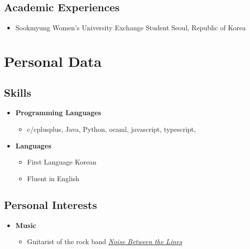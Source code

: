 \documentclass[11pt,a4paper,sans]{moderncv}
\newcommand{\seoul}{Seoul, Republic of Korea}
\begin{document}
\subsection{Academic Experiences}
\vspace{5pt}
\begin{itemize}
    \item{
                  {Sookmyung Women's University}
                  {Exchange Student}
                  {\seoul}
                  {}
                  {}
    }
\vspace{4mm}
\end{itemize}

\section{Personal Data}

\vspace{6pt}

\subsection{Skills}
\vspace{5pt}

\begin{itemize}



\item \textbf{Programming Languages}  
\vspace{-2mm}
\begin{itemize}
    \item c/cplusplus, Java, Python, ocaml, javascript, typescript, 
\end{itemize}


\item \textbf{Languages}
\vspace{-2mm}
\begin{itemize}
    \item First Language Korean
    \item Fluent in English
\end{itemize}

\vspace{6pt}

\end{itemize}

\subsection{Personal Interests}
\vspace{2mm}
\begin{itemize}
    \item \textbf{Music}
    \vspace{-2mm}
    \begin{itemize}
        \item Guitarist of the rock band  \href{https://www.instagram.com/noise_btl/}{\textit{Noise Between the Lines}}
    \end{itemize}
\end{itemize}
\end{document}
